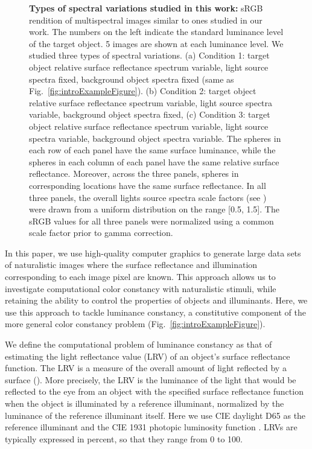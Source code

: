 \documentclass{jov}
\begin{document}
\begin{figure}
\begin{subfigure}[b]{0.33 \textwidth}
        \label{fig:allSpectraVarying}
    \end{subfigure}    
    \caption{{\bf Types of spectral variations studied in this work:} sRGB rendition of multispectral images similar to ones studied in our work. The numbers on the left indicate the standard luminance level of the target object. 5 images are shown at each luminance level. We studied three types of spectral variations. (a) Condition 1: target object relative surface reflectance spectrum variable, light source spectra fixed, background object spectra fixed (same as Fig.~\ref{fig:introExampleFigure}).
(b) Condition 2: target object relative surface reflectance spectrum variable, light source spectra variable, background object spectra fixed, (c) Condition 3: target object relative surface reflectance spectrum variable, light source spectra variable, background object spectra variable. The spheres in each row of each panel have the same surface luminance, while the spheres in each column of each panel have the same relative surface reflectance.  Moreover, across the three panels, spheres in corresponding locations have the same surface reflectance. In all three panels, the overall lights source spectra scale factors (see ) were drawn from a uniform distribution on the range [0.5, 1.5]. The sRGB values for all three panels were normalized using a common scale factor prior to gamma correction.} 
\label{fig:studiedCases}
\end{figure}

In this paper, we use high-quality computer graphics to generate large data sets of naturalistic images where the surface reflectance and illumination corresponding to each image pixel are known. 
This approach allows us to investigate computational color constancy with naturalistic stimuli, while retaining the ability to control the properties of objects and illuminants. Here, we use this approach to tackle luminance constancy, a constitutive component of the more general color constancy problem (Fig.~\ref{fig:introExampleFigure}). 

We define the computational problem of luminance constancy as that of estimating the light reflectance value (LRV) of an object's surface reflectance function.
The LRV is a measure of the overall amount of light reflected by a surface (\citeauthor{astm1121477}).
More precisely, the LRV is the luminance of the light that would be reflected to the eye from an object with the 
specified surface reflectance function when the object is illuminated by a reference illuminant,
normalized by the luminance of the reference illuminant itself.
Here we use CIE daylight D65 as the reference illuminant and the CIE 1931 photopic luminosity function \cite{CIE86}.
LRVs are typically expressed in percent, so that they range from 0 to 100.
\end{document}
